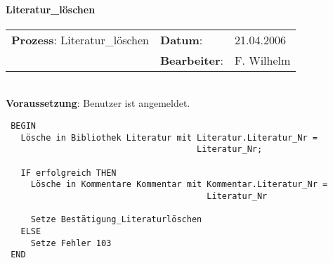 \paragraph{Literatur\_löschen}
\begin{tabular}[t]{p{9.5cm}ll}
\textbf{Prozess}: Literatur\_löschen  	&\textbf{Datum}:      &21.04.2006\\
					&\textbf{Bearbeiter}: &F. Wilhelm\\
\end{tabular}

\hrulefill\\
\textbf{Voraussetzung}: Benutzer ist angemeldet.
\begin{verbatim}
 BEGIN
   Lösche in Bibliothek Literatur mit Literatur.Literatur_Nr = 
                                      Literatur_Nr;

   IF erfolgreich THEN
     Lösche in Kommentare Kommentar mit Kommentar.Literatur_Nr = 
                                        Literatur_Nr

     Setze Bestätigung_Literaturlöschen
   ELSE
     Setze Fehler 103
 END
\end{verbatim}
\hrulefill